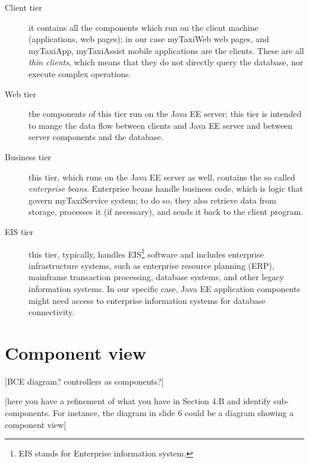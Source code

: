 \begin{description}
	\item [Client tier] it contains all the components which run on the client machine (applications, web pages); in our case myTaxiWeb web pages, and myTaxiApp, myTaxiAssist mobile applications are the clients. These are all \emph{thin clients}, which means that they do not directly query the database, nor execute complex operations. 
	
	\item [Web tier] the components of this tier run on the Java EE server; this tier is intended to mange the data flow between clients and Java EE server and between server components and the database.

	\item [Business tier] this tier, which runs on the Java EE server as well, contains the so called \emph{enterprise beans}. Enterprise beans handle business code, which is logic that govern myTaxiService system; to do so, they also retrieve data from storage, processes it (if necessary), and sends it back to the client program.

	\item [EIS tier] this tier, typically, handles EIS\footnote{EIS stands for Enterprise information system.} software and includes enterprise infrastructure systems, such as enterprise resource planning (ERP), mainframe transaction processing, database systems, and other legacy information systems. In our specific case, Java EE application components might need access to enterprise information systems for database connectivity.
	
\end{description}













\clearpage%
\section{Component view}\label{sec:componentView}
[BCE diagram? controllers as components?]

[here you have a refinement of what you have in Section 4.B and identify sub-components. For instance, the diagram in slide 6 could be a diagram showing a  component view]


